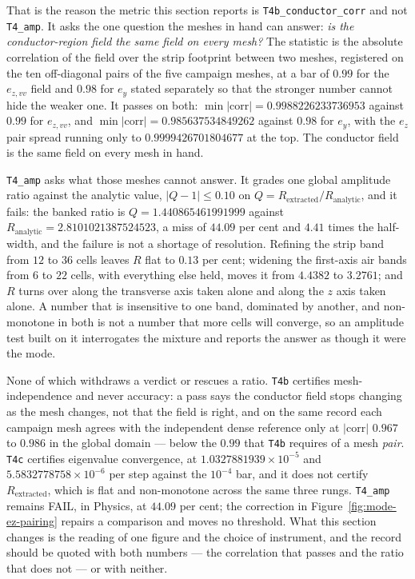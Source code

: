That is the reason the metric this section reports is \texttt{T4b\_conductor\_corr} and not \texttt{T4\_amp}. It
asks the one question the meshes in hand can answer: \emph{is the conductor-region field the same field on every
mesh?} The statistic is the absolute correlation of the field over the strip footprint between two meshes,
registered on the ten off-diagonal pairs of the five campaign meshes, at a bar of $0.99$ for the $e_{z,vv}$ field
and $0.98$ for $e_y$ stated separately so that the stronger number cannot hide the weaker one. It passes on
both: $\min|\mathrm{corr}| = 0.9988226233736953$ against $0.99$ for $e_{z,vv}$, and
$\min|\mathrm{corr}| = 0.985637534849262$ against $0.98$ for $e_y$, with the $e_z$ pair spread running only to
$0.9999426701804677$ at the top. The conductor field is the same field on every mesh in hand.

\texttt{T4\_amp} asks what those meshes cannot answer. It grades one global amplitude ratio against the
analytic value, $|Q - 1| \le 0.10$ on $Q = R_{\text{extracted}}/R_{\text{analytic}}$, and it fails: the banked
ratio is $Q = 1.440865461991999$ against $R_{\text{analytic}} = 2.8101021387524523$, a miss of $44.09$ per cent
and $4.41$ times the half-width, and the failure is not a shortage of resolution. Refining the strip band from
$12$ to $36$ cells leaves $R$ flat to $0.13$ per cent; widening the first-axis air bands from $6$ to $22$ cells,
with everything else held, moves it from $4.4382$ to $3.2761$; and $R$ turns over along the transverse axis taken
alone and along the $z$ axis taken alone. A number that is insensitive to one band, dominated by another, and
non-monotone in both is not a number that more cells will converge, so an amplitude test built on it interrogates
the mixture and reports the answer as though it were the mode.

None of which withdraws a verdict or rescues a ratio. \texttt{T4b} certifies mesh-independence and never
accuracy: a pass says the conductor field stops changing as the mesh changes, not that the field is right, and
on the same record each campaign mesh agrees with the independent dense reference only at $|\mathrm{corr}|$
$0.967$ to $0.986$ in the global domain --- below the $0.99$ that \texttt{T4b} requires of a mesh \emph{pair}.
\texttt{T4c} certifies eigenvalue convergence, at $1.0327881939\times10^{-5}$ and $5.5832778758\times10^{-6}$ per
step against the $10^{-4}$ bar, and it does not certify $R_{\text{extracted}}$, which is flat and non-monotone
across the same three rungs. \texttt{T4\_amp} remains FAIL, in Physics, at $44.09$ per cent; the correction in
Figure~\ref{fig:mode-ez-pairing} repairs a comparison and moves no threshold. What this section changes is the
reading of one figure and the choice of instrument, and the record should be quoted with both numbers --- the
correlation that passes and the ratio that does not --- or with neither.
